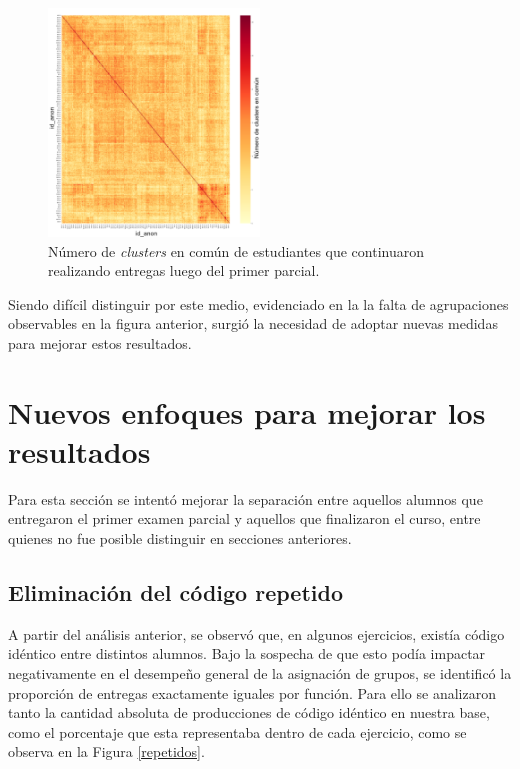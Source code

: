 \documentclass[11pt,a4paper,twoside,openany]{tesis}
\begin{document}
\begin{figure}[H]
    \centering
    \includegraphics[width=0.5\textwidth]{imagenes/clusters-no-13.png}
    \caption{Número de  \emph{clusters} en común de estudiantes que continuaron realizando entregas luego del primer parcial.}
    \label{cluster2}
\end{figure}

Siendo difícil distinguir por este medio, evidenciado en la la falta de agrupaciones observables en la figura anterior, surgió la necesidad de adoptar nuevas medidas para mejorar estos resultados. 

\section{Nuevos enfoques para mejorar los resultados}

Para esta sección se intentó mejorar la separación entre aquellos alumnos que entregaron el primer examen parcial y aquellos que finalizaron el curso, entre quienes no fue posible distinguir en secciones anteriores. 

\subsection{Eliminación del código repetido}

A partir del análisis anterior, se observó que, en algunos ejercicios, existía código idéntico entre distintos alumnos. Bajo la sospecha de que esto podía impactar negativamente en el desempeño general de la asignación de grupos, se identificó la proporción de entregas exactamente iguales por función. Para ello se analizaron tanto la cantidad absoluta de producciones de código idéntico en nuestra base, como el porcentaje que esta representaba dentro de cada ejercicio, como se observa en la Figura \ref{repetidos}. 
\end{document}
